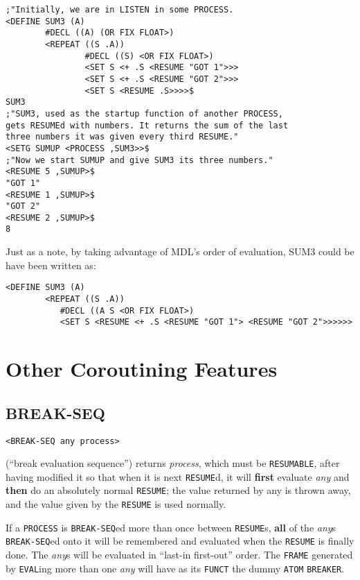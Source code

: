 \documentclass[a4paper]{scrbook}
\begin{document}

\begin{verbatim}
;"Initially, we are in LISTEN in some PROCESS.
<DEFINE SUM3 (A)
        #DECL ((A) (OR FIX FLOAT>)
        <REPEAT ((S .A))
                #DECL ((S) <OR FIX FLOAT>)
                <SET S <+ .S <RESUME "GOT 1">>>
                <SET S <+ .S <RESUME "GOT 2">>>
                <SET S <RESUME .S>>>>$
SUM3
;"SUM3, used as the startup function of another PROCESS,
gets RESUMEd with numbers. It returns the sum of the last
three numbers it was given every third RESUME."
<SETG SUMUP <PROCESS ,SUM3>>$
;"Now we start SUMUP and give SUM3 its three numbers."
<RESUME 5 ,SUMUP>$
"GOT 1"
<RESUME 1 ,SUMUP>$
"GOT 2"
<RESUME 2 ,SUMUP>$
8
\end{verbatim}

Just as a note, by taking advantage of MDL's order of evaluation, SUM3 could be have been written as:

\begin{verbatim}
<DEFINE SUM3 (A)
        <REPEAT ((S .A))
           #DECL ((A S <OR FIX FLOAT>)
           <SET S <RESUME <+ .S <RESUME "GOT 1"> <RESUME "GOT 2">>>>>>
\end{verbatim}

\section{Other Coroutining Features}\label{other-coroutining-features}

\subsection{BREAK-SEQ}\label{break-seq}

\begin{verbatim}
<BREAK-SEQ any process>
\end{verbatim}

 (``break evaluation sequence'') returns \emph{process}, which must be \texttt{RESUMABLE},
after having modified it so that when it is next \texttt{RESUME}d, it will \textbf{first} evaluate
\emph{any} and \textbf{then} do an absolutely normal \texttt{RESUME}; the value returned by any is thrown away, and the
value given by the \texttt{RESUME} is used normally.

If a \texttt{PROCESS} is \texttt{BREAK-SEQ}ed more than once between \texttt{RESUME}s, \textbf{all} of the \emph{any}s
\texttt{BREAK-SEQ}ed onto it will be remembered and evaluated when the \texttt{RESUME} is finally done. The \emph{any}s
will be evaluated in ``last-in first-out'' order. The \texttt{FRAME} generated by \texttt{EVAL}ing more than one \emph{any}
will have as its \texttt{FUNCT} the dummy \texttt{ATOM} \texttt{BREAKER}.
\end{document}
